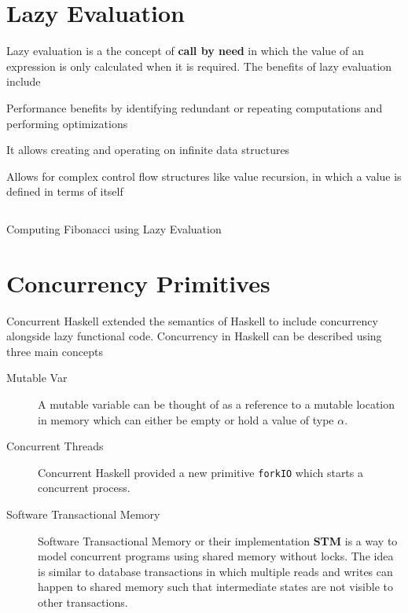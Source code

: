 \section{Lazy Evaluation}
Lazy evaluation is a the concept of \textbf{call by need} in which the value of an expression is only calculated when it is required.
The benefits of lazy evaluation include
\begin{packed_itemize}
\item Performance benefits by identifying redundant or repeating computations and performing optimizations
\item It allows creating and operating on infinite data structures
\item Allows for complex control flow structures like value recursion, in which a value is defined in terms of itself
\end{packed_itemize}

\begin{listing}
\inputminted{literate-haskell}{hs/fibonacci.lhs}
\caption{Computing Fibonacci using Lazy Evaluation}
\end{listing}

\section{Concurrency Primitives}
Concurrent Haskell\cite{jones1996concurrent} extended the semantics of Haskell to include concurrency alongside lazy functional code.
Concurrency in Haskell can be described using three main concepts
\begin{description}
\item[Mutable Var] A mutable variable can be thought of as a reference to a mutable location in memory which can either be empty or hold
a value of type \textbf{$\alpha$}.
\item[Concurrent Threads] Concurrent Haskell provided a new primitive \texttt{forkIO} which starts a concurrent process.
\item[Software Transactional Memory] Software Transactional Memory or their implementation \textbf{STM}\cite{harris2005composable}
is a way to model concurrent programs using shared memory without locks. The idea is similar to database transactions in which multiple
reads and writes can happen to shared memory such that intermediate states are not visible to other transactions.
\end{description}


